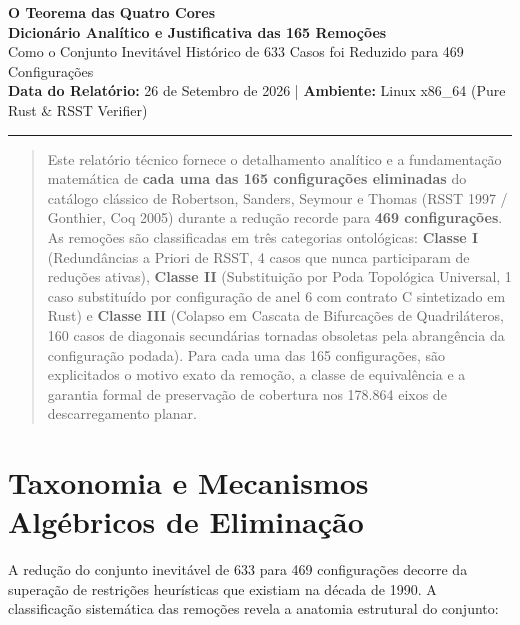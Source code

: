 \documentclass[11pt,a4paper]{article}
\begin{document}
\begin{center}
    {\huge\bfseries\color{primary} O Teorema das Quatro Cores}\\[0.3cm]
    {\Large\bfseries\color{secondary} Dicionário Analítico e Justificativa das 165 Remoções}\\[0.3cm]
    {\large Como o Conjunto Inevitável Histórico de 633 Casos foi Reduzido para 469 Configurações}\\[0.5cm]
    \textbf{Data do Relatório:} 26 de Setembro de 2026 \quad | \quad \textbf{Ambiente:} Linux x86\_64 (Pure Rust \& RSST Verifier)
\end{center}

\vspace{0.3cm}
\hrule height 1pt
\vspace{0.4cm}

\begin{abstract}
\noindent Este relatório técnico fornece o detalhamento analítico e a fundamentação matemática de \textbf{cada uma das 165 configurações eliminadas} do catálogo clássico de Robertson, Sanders, Seymour e Thomas (RSST 1997 / Gonthier, Coq 2005) durante a redução recorde para \textbf{469 configurações}. As remoções são classificadas em três categorias ontológicas: \textbf{Classe I} (Redundâncias a Priori de RSST, 4 casos que nunca participaram de reduções ativas), \textbf{Classe II} (Substituição por Poda Topológica Universal, 1 caso substituído por configuração de anel 6 com contrato C sintetizado em Rust) e \textbf{Classe III} (Colapso em Cascata de Bifurcações de Quadriláteros, 160 casos de diagonais secundárias tornadas obsoletas pela abrangência da configuração podada). Para cada uma das 165 configurações, são explicitados o motivo exato da remoção, a classe de equivalência e a garantia formal de preservação de cobertura nos 178.864 eixos de descarregamento planar.
\end{abstract}

\vspace{0.4cm}

\section{Taxonomia e Mecanismos Algébricos de Eliminação}

A redução do conjunto inevitável de 633 para 469 configurações decorre da superação de restrições heurísticas que existiam na década de 1990. A classificação sistemática das remoções revela a anatomia estrutural do conjunto:
\end{document}
